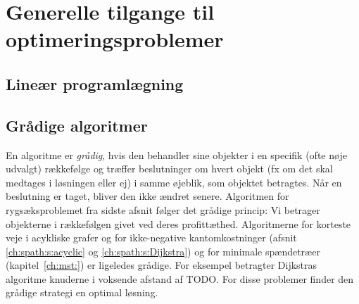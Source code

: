 \chapter{Generelle tilgange til optimeringsproblemer}%

\renewcommand{\labelprefix}{ch:optimization}
\llabel{}

\section{Lineær programlægning}
%

\section{Grådige algoritmer}
%
%

En algoritme er \emph{grådig}, hvis den behandler sine objekter i en specifik (ofte nøje udvalgt) rækkefølge og træffer beslutninger om hvert objekt (fx om det skal medtages i løsningen eller ej) i samme øjeblik, som objektet betragtes.
Når en beslutning er taget, bliver den ikke ændret senere.
Algoritmen for rygsæksproblemet fra sidste afsnit følger det grådige princip:
Vi betrager objekterne i rækkefølgen givet ved deres profittæthed.
Algoritmerne for korteste veje i acykliske grafer og for ikke-negative kantomkostninger
(afsnit \ref{ch:spath:s:acyclic} og \ref{ch:spath:s:Dijkstra}) og for minimale spændetræer (kapitel~\ref{ch:mst:}) er ligeledes grådige.
For eksempel betragter Dijkstras algoritme knuderne i voksende afstand af TODO.
For disse problemer finder den grådige strategi en optimal løsning.

